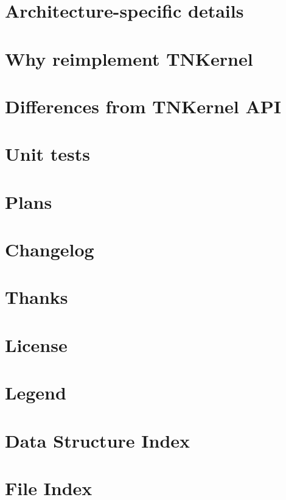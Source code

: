 \documentclass[twoside]{book}
\newcommand{\+}{\discretionary{\mbox{\scriptsize$\hookleftarrow$}}{}{}}
\begin{document}
\chapter{Architecture-\/specific details}
\label{arch_specific}
\hypertarget{arch_specific}{}

\chapter{Why reimplement T\+N\+Kernel}
\label{why_reimplement}
\hypertarget{why_reimplement}{}

\chapter{Differences from T\+N\+Kernel A\+P\+I}
\label{tnkernel_diff}
\hypertarget{tnkernel_diff}{}

\chapter{Unit tests}
\label{unit_tests}
\hypertarget{unit_tests}{}

\chapter{Plans}
\label{plans}
\hypertarget{plans}{}

\chapter{Changelog}
\label{changelog}
\hypertarget{changelog}{}

\chapter{Thanks}
\label{thanks}
\hypertarget{thanks}{}

\chapter{License}
\label{license}
\hypertarget{license}{}

\chapter{Legend}
\label{legend}
\hypertarget{legend}{}

\chapter{Data Structure Index}

\chapter{File Index}

\end{document}
